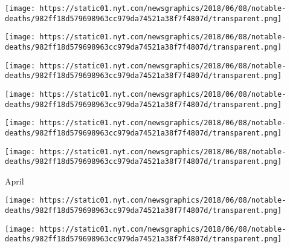 \texttt{[image: https://static01.nyt.com/newsgraphics/2018/06/08/notable-deaths/982ff18d579698963cc979da74521a38f7f4807d/transparent.png]}

\href{https://www.nytimes.com/2018/05/07/obituaries/edwin-burrows-historian-and-co-author-of-gotham-dies-at-74.html}{}

\texttt{[image: https://static01.nyt.com/newsgraphics/2018/06/08/notable-deaths/982ff18d579698963cc979da74521a38f7f4807d/transparent.png]}

\href{https://www.nytimes.com/2018/05/06/obituaries/jhoon-rhee-athletic-ambassador-of-taekwondo-dies-at-86.html}{}

\texttt{[image: https://static01.nyt.com/newsgraphics/2018/06/08/notable-deaths/982ff18d579698963cc979da74521a38f7f4807d/transparent.png]}

\href{https://www.nytimes.com/2018/05/04/obituaries/thom-devita-85-dies-revolutionized-the-art-of-tattooing.html}{}

\texttt{[image: https://static01.nyt.com/newsgraphics/2018/06/08/notable-deaths/982ff18d579698963cc979da74521a38f7f4807d/transparent.png]}

\href{https://www.nytimes.com/2018/05/02/obituaries/art-paul-art-director-who-gave-playboy-its-look-dies-at-93.html}{}

\texttt{[image: https://static01.nyt.com/newsgraphics/2018/06/08/notable-deaths/982ff18d579698963cc979da74521a38f7f4807d/transparent.png]}

\href{https://www.nytimes.com/2018/05/01/obituaries/jabo-starks-drummer-for-james-brown-dies-at-79.html}{}

\texttt{[image: https://static01.nyt.com/newsgraphics/2018/06/08/notable-deaths/982ff18d579698963cc979da74521a38f7f4807d/transparent.png]}

April

\href{https://www.nytimes.com/2018/04/30/obituaries/abbas-attar-who-photographed-irans-revolution-dies-at-74.html}{}

\texttt{[image: https://static01.nyt.com/newsgraphics/2018/06/08/notable-deaths/982ff18d579698963cc979da74521a38f7f4807d/transparent.png]}

\href{https://www.nytimes.com/2018/04/30/obituaries/judith-leiber-97-dies-turned-handbags-into-objets-dart.html}{}

\texttt{[image: https://static01.nyt.com/newsgraphics/2018/06/08/notable-deaths/982ff18d579698963cc979da74521a38f7f4807d/transparent.png]}

\href{https://www.nytimes.com/2018/04/28/obituaries/larry-harvey-burning-man-festival-dead-at-70.html}{}

